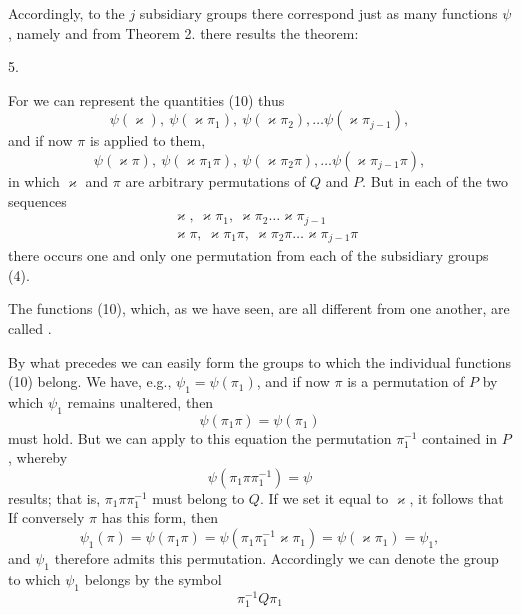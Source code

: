 

Accordingly, to the $j$ subsidiary groups there correspond just as many functions $\psi$, namely
and from Theorem 2. there results the theorem:

5. 

For we can represent the quantities (10) thus
\[
\psi(\varkappa),\ \psi(\varkappa\pi_1),\ \psi(\varkappa\pi_2),\ldots \psi(\varkappa\pi_{j-1}),
\]
and if now $\pi$ is applied to them,
\[
\psi(\varkappa\pi),\ \psi(\varkappa\pi_1\pi),\ \psi(\varkappa\pi_2\pi),\ldots \psi(\varkappa\pi_{j-1}\pi),
\]
in which $\varkappa$ and $\pi$ are arbitrary permutations of $Q$ and $P$. But in each of the two sequences
\[
\begin{aligned}
&\varkappa,\ \varkappa\pi_1,\ \varkappa\pi_2\ldots\varkappa\pi_{j-1}\\
&\varkappa\pi,\ \varkappa\pi_1\pi,\ \varkappa\pi_2\pi\ldots\varkappa\pi_{j-1}\pi
\end{aligned}
\]
there occurs one and only one permutation from each of the subsidiary groups (4).

The functions (10), which, as we have seen, are all different from one another, are called .

By what precedes we can easily form the groups to which the individual functions (10) belong. We have, e.g., $\psi_1 = \psi(\pi_1)$, and if now $\pi$ is a permutation of $P$ by which $\psi_1$ remains unaltered, then
\[
\psi(\pi_1\pi) = \psi(\pi_1)
\]
must hold. But we can apply to this equation the permutation $\pi_1^{-1}$ contained in $P$, whereby
\[
\psi(\pi_1\pi\pi_1^{-1}) = \psi
\]
results; that is, $\pi_1\pi\pi_1^{-1}$ must belong to $Q$. If we set it equal to $\varkappa$, it follows that
If conversely $\pi$ has this form, then
\[
\psi_1(\pi) = \psi(\pi_1\pi) = \psi(\pi_1\pi_1^{-1}\varkappa\pi_1) = \psi(\varkappa\pi_1) = \psi_1,
\]
and $\psi_1$ therefore admits this permutation. Accordingly we can denote the group to which $\psi_1$ belongs by the symbol
\[
\pi_1^{-1}Q\pi_1
\]
